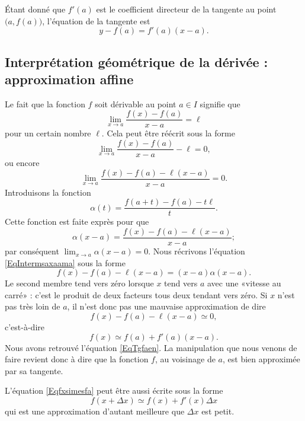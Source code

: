 Étant donné que \( f'(a)\) est le coefficient directeur de la tangente au point \( \big( a,f(a) \big)\), l'équation de la tangente est
\begin{equation}		\label{EqTgfaen}
	y-f(a)=f'(a)(x-a).
\end{equation}

\subsection[Interprétation géométrique : approximation affine]{Interprétation géométrique de la dérivée : approximation affine}

Le fait que la fonction \( f\) soit dérivable au point \( a\in I\) signifie que
\begin{equation}
	\lim_{x\to a} \frac{ f(x)-f(a) }{ x-a }=\ell
\end{equation}
pour un certain nombre \( \ell\). Cela peut être réécrit sous la forme
\begin{equation}
	\lim_{x\to a} \frac{ f(x)-f(a) }{ x-a }-\ell=0,
\end{equation}
ou encore
\begin{equation}
	\lim_{x\to a} \frac{ f(x)-f(a)-\ell(x-a) }{ x-a }=0.
\end{equation}
Introduisons la fonction
\begin{equation}
	\alpha(t)=\frac{ f(a+t)-f(a)-t\ell }{ t }.
\end{equation}
Cette fonction est faite exprès pour que
\begin{equation}		\label{EqIntermsaxaama}
	\alpha(x-a)=\frac{ f(x)-f(a)-\ell(x-a) }{ x-a };
\end{equation}
par conséquent \( \lim_{x\to a} \alpha(x-a)=0\). Nous récrivons l'équation \eqref{EqIntermsaxaama} sous la forme
\begin{equation}        \label{EqCodeDerviffxam}
	f(x)-f(a)-\ell(x-a)=(x-a)\alpha(x-a).
\end{equation}
Le second membre tend vers zéro lorsque \( x\) tend vers \( a\) avec une «vitesse au carré» : c'est le produit de deux facteurs tous deux tendant vers zéro. Si \( x\) n'est pas très loin de \( a\), il n'est donc pas une mauvaise approximation de dire
\begin{equation}
	f(x)-f(a)-\ell(x-a)\simeq 0,
\end{equation}
c'est-à-dire
\begin{equation}		\label{Eqfxsimesfa}
	f(x)\simeq f(a)+f'(a)(x-a).
\end{equation}
Nous avons retrouvé l'équation \eqref{EqTgfaen}. La manipulation que nous venons de faire revient donc à dire que la fonction \( f\), au voisinage de \( a\), est bien approximée par sa tangente.

L'équation \eqref{Eqfxsimesfa} peut être aussi écrite sous la forme
\begin{equation}		\label{EqfxdxSimeqfxfpx}
	f(x+\Delta x)\simeq f(x)+f'(x)\Delta x
\end{equation}
qui est une approximation d'autant meilleure que \( \Delta x\) est petit.
